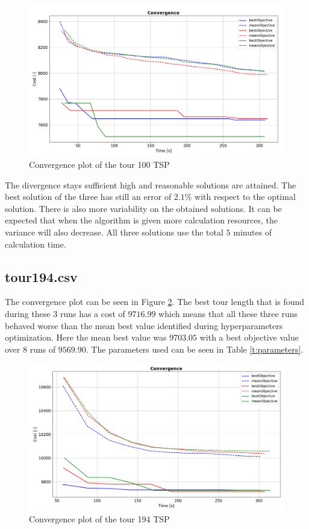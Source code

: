 \documentclass[a4paper,10pt]{article}
\begin{document}
\begin{figure}[h!]
	
	\includegraphics[width=1.0\textwidth]{convergence_tour100.PNG}
	\caption{Convergence plot of the tour 100 TSP}
	\label{fig:convergence_tour100}
	\centering
\end{figure}

The divergence stays sufficient high and reasonable solutions are attained. The best solution of the three has still an error of $ 2.1 \% $ with respect to the optimal solution. There is also more variability on the obtained solutions. It can be expected that when the algorithm is given more calculation resources, the variance will also decrease. All three solutions use the total $ 5 $ minutes of calculation time.

\subsection{tour194.csv}
The convergence plot can be seen in Figure \ref{fig:convergence_tour194}.
The best tour length that is found during these $ 3 $ runs has a cost of $9716.99  $ which means that all these three runs behaved worse than the mean best value identified during hyperparameters optimization. Here the mean best value was $ 9703.05 $ with a best objective value over $ 8 $ runs of $ 9569.90 $.
The parameters used can be seen in Table \ref{t:parameters}.

\begin{figure}[h!]
	\includegraphics[width=1.0\textwidth]{convergence_tour194.PNG}
	\caption{Convergence plot of the tour 194 TSP}
	\label{fig:convergence_tour194}
	\centering
\end{figure}
\end{document}
